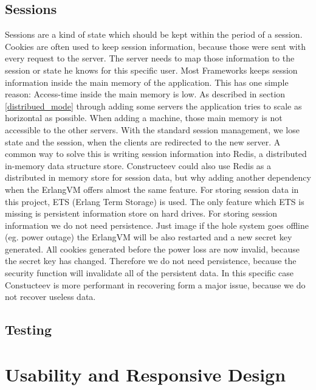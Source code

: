 \section{Sessions}
Sessions are a kind of state which should be kept within the period of a session. Cookies are often used to keep session information, because those were sent with every request to the server. The server needs to map those information to the session or state he knows for this specific user. Most Frameworks keeps session information inside the main memory of the application. This has one simple reason: Access-time inside the main memory is low. 
As described in section \ref{distribued_mode} through adding some servers the application tries to scale as horizontal as possible. When adding a machine, those main memory is not accessible to the other servers. With the standard session management, we lose state and the session, when the clients are redirected to the new server.  A common way to solve this is writing session information into Redis, a distributed in-memory data structure store. 
Constructeev could also use Redis as a distributed in memory store for session data, but why adding another dependency when the ErlangVM offers almost the same feature. For storing session data in this project, ETS (Erlang Term Storage) is used. The only feature which ETS is missing is persistent information store on hard drives. For storing session information we do not need persistence. Just image if the hole system goes offline (eg. power outage) the ErlangVM will be also restarted and a new secret key generated. All cookies generated before the power loss are now invalid, because the secret key has changed. Therefore we do not need persistence, because the security function will invalidate all of the persistent data. In this specific case Constucteev is more performant in recovering form a major issue, because we do not recover useless data.

\section{Testing}

\chapter{Usability and Responsive Design}

